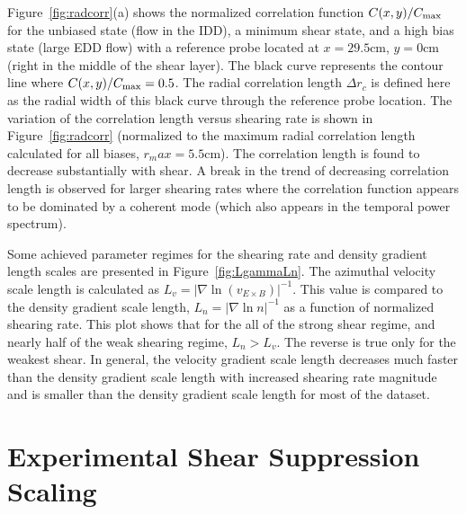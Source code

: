 \documentclass[aip,pop,amsmath,amssymb,preprint,superscriptaddress]{revtex4-1} %
\begin{document}
Figure~\ref{fig:radcorr}(a) shows the normalized correlation function $C(x,y)/C_{\rm max}$ for the unbiased state (flow in the IDD), a minimum shear state, and a high bias state (large EDD flow) with a reference probe located at $x=29.5$cm, $y=0$cm (right in the middle of the shear layer). The black curve represents the contour line where $C(x,y)/C_{\rm max} = 0.5$. The radial correlation length $\Delta r_{c}$ is defined here as the radial width of this black curve through the reference probe location.   The variation of the correlation length versus shearing rate is shown in Figure~\ref{fig:radcorr} (normalized to the maximum radial correlation length calculated for all biases, $r_max = 5.5$cm).
The correlation length is found to decrease substantially with shear.  A break in the trend of decreasing correlation length is observed for larger shearing rates where the correlation function appears to be dominated by a coherent mode (which also appears in the temporal power spectrum).

Some achieved parameter regimes for the shearing rate and density
gradient length scales are presented in Figure~\ref{fig:LgammaLn}. The
azimuthal velocity scale length is calculated as $L_{v} = |\nabla
\ln(v_{E\times B})|^{-1}$. This value is compared to the density
gradient scale length, $L_{n} = |\nabla \ln{n}|^{-1}$ as a function of
normalized shearing rate. This plot shows that for the all of the
strong shear regime, and nearly half of the weak shearing regime,
$L_{n} > L_{v}$. The reverse is true only for the weakest shear. In
general, the velocity gradient scale length decreases much faster than the density gradient scale length with increased shearing rate magnitude and is smaller than the density gradient scale length for most of the dataset.

\section{Experimental Shear Suppression Scaling}
\end{document}
